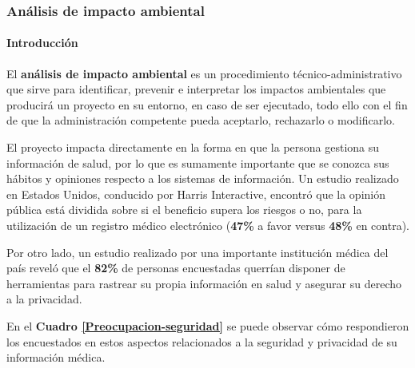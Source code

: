 \subsubsection{Análisis de impacto ambiental}


\paragraph{Introducción}
	El \textbf{análisis de impacto ambiental} es un procedimiento técnico-administrativo que sirve para identificar, prevenir e interpretar los impactos ambientales que producirá un proyecto en su entorno, en caso de ser ejecutado, todo ello con el fin de que la administración competente pueda aceptarlo, rechazarlo o modificarlo.
    
    El proyecto impacta directamente en la forma en que la persona gestiona su información de salud, por lo que es sumamente importante que se conozca sus hábitos y opiniones respecto a los sistemas de información.
    Un estudio realizado en Estados Unidos, conducido por Harris Interactive, encontró que la opinión pública está dividida sobre si el beneficio supera los riesgos o no, para la utilización de un registro médico electrónico (\textbf{47\%} a favor versus \textbf{48\%} en contra).
    
    Por otro lado, un estudio realizado por una importante institución médica del país reveló que el \textbf{82\%} de personas encuestadas querrían disponer de herramientas para rastrear su propia información en salud y asegurar su derecho a la privacidad.
    
    En el \textbf{Cuadro \ref{Preocupacion-seguridad}} se puede observar cómo respondieron los encuestados en estos aspectos relacionados a la seguridad y privacidad de su información médica.
    

